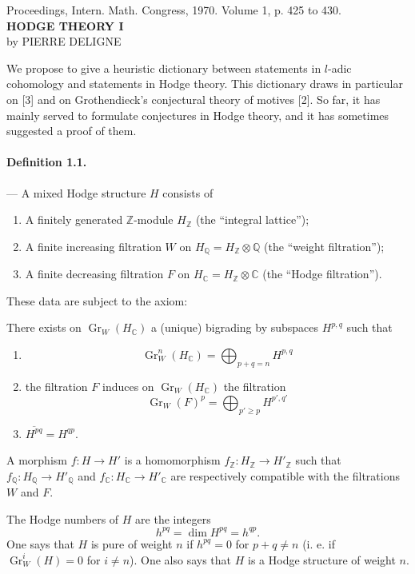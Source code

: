 \documentclass[10pt]{article}
\newcommand{\C}{\mathbb C}
\newcommand{\Q}{\mathbb Q}
\newcommand{\Z}{\mathbb Z}
\newcommand{\Gr}{\operatorname{Gr}}
\begin{document}
\begin{center}
{\small Proceedings, Intern. Math. Congress, 1970. Volume 1, p. 425 to 430.}\\[4em]
{\Large\bfseries HODGE THEORY I}\\[1.6em]
{\large by PIERRE DELIGNE}
\end{center}

We propose to give a heuristic dictionary between statements in $l$-adic cohomology and statements in Hodge theory. This dictionary draws in particular on [3] and on Grothendieck's conjectural theory of motives [2]. So far, it has mainly served to formulate conjectures in Hodge theory, and it has sometimes suggested a proof of them.

\paragraph{Definition 1.1.} — A mixed Hodge structure $H$ consists of
\begin{enumerate}[label=(\alph*)]
\item A finitely generated $\Z$-module $H_\Z$ (the “integral lattice”);
\item A finite increasing filtration $W$ on $H_\Q=H_\Z\otimes\Q$ (the “weight filtration”); %
\item A finite decreasing filtration $F$ on $H_\C=H_\Z\otimes\C$ (the “Hodge filtration”).
\end{enumerate}
These data are subject to the axiom:

There exists on $\Gr_W(H_\C)$ a (unique) bigrading by subspaces $H^{p,q}$ such that
\begin{enumerate}[label=(\roman*)]
\item
\[
\Gr_W^n(H_\C)=\bigoplus_{p+q=n}H^{p,q}
\]
\item the filtration $F$ induces on $\Gr_W(H_\C)$ the filtration
\[
\Gr_W(F)^p=\bigoplus_{p'\ge p}H^{p',q'}
\]
\item $\overline{H^{pq}}=H^{qp}$.
\end{enumerate}
A morphism $f:H\to H'$ is a homomorphism $f_\Z:H_\Z\to H'_\Z$ such that $f_\Q:H_\Q\to H'_\Q$ and $f_\C:H_\C\to H'_\C$ are respectively compatible with the filtrations $W$ and $F$.

The Hodge numbers of $H$ are the integers
\[
\tag{1.2}
h^{pq}=\dim H^{pq}=h^{qp}.
\]
One says that $H$ is pure of weight $n$ if $h^{pq}=0$ for $p+q\ne n$ (i. e. if $\Gr_W^i(H)=0$ for $i\ne n$). One also says that $H$ is a Hodge structure of weight $n$.
\end{document}
